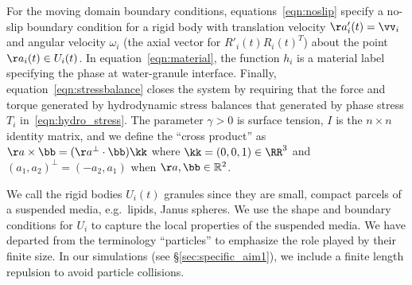For the moving domain boundary conditions,
equations~\eqref{eqn:noslip} specify a no-slip boundary condition for a
rigid body with translation velocity $\aa'_i(t) = \vv_i$ and angular
velocity $\omega_i$ (the axial vector for $R'_i(t)R_i(t)^T$)
about the point $\aa_i(t) \in U_i(t)$. In
equation~\eqref{eqn:material}, the function $h_i$ is a material label
specifying the phase at water-granule interface.
Finally, equation~\eqref{eqn:stressbalance} closes the system by requiring that
the force and torque generated by hydrodynamic stress balances that
generated by phase stress $T_i$ in~\eqref{eqn:hydro_stress}. The
parameter $\gamma > 0$ is surface tension,
$I$ is the $n\times n$ identity matrix,
and we define the ``cross product'' as
$\aa \times \bb = (\aa^{\perp} \cdot \bb) \kk$ where $\kk = (0,0,1) \in
\RR^3$ and $(a_1,a_2)^{\perp} = (-a_2,a_1)$ when $\aa, \bb \in \mathbb{R}^2$.

We call the rigid bodies $U_i(t)$ granules since they are small, compact
parcels of a suspended media, e.g.~lipids, Janus spheres. We use the
shape and boundary conditions for $U_i$ to capture the local properties
of the suspended media. We have departed from the terminology
``particles'' to emphasize the role played by their finite size. In our
simulations (see \S\ref{sec:specific_aim1}), we include a finite length
repulsion to avoid particle collisions.

